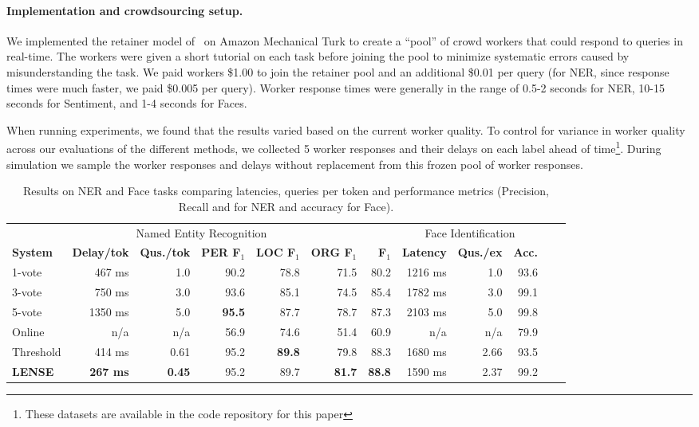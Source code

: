 \paragraph{Implementation and crowdsourcing setup.}
We implemented the retainer model of~\cite{bernstein2011crowds} on Amazon Mechanical Turk to create a ``pool'' of crowd workers that could respond to queries in real-time.
The workers were given a short tutorial on each task before joining the pool to minimize systematic errors caused by misunderstanding the task.
We paid workers \$1.00 to join the retainer pool and an additional \$0.01 per query (for NER, since response times were much faster, we paid \$0.005 per query).
Worker response times were generally in the range of 0.5-2 seconds for NER, 10-15 seconds for Sentiment, and 1-4 seconds for Faces.

When running experiments, we found that the results varied based on the current worker quality. %
To control for variance in worker quality across our evaluations of the different methods, we collected 5 worker responses and their delays on each label ahead of time\footnote{These datasets are available in the code repository for this paper}.
During simulation we sample the worker responses and delays without replacement from this frozen pool of worker responses.

\begin{table}[t]
\begin{tabular}{l r r r r r r | r r r r r}
  \multicolumn{7}{c|}{Named Entity Recognition} & 
      \multicolumn{3}{c}{Face Identification} \\
      \textbf{System} & \textbf{Delay/tok} & \textbf{Qus./tok} & \textbf{PER F$_1$} & \textbf{LOC F$_1$} & \textbf{ORG F$_1$} & \textbf{F$_1$}
          & \textbf{Latency} & \textbf{Qus./ex} & \textbf{Acc.} 
    \\ \hline
    1-vote & 467 ms & 1.0 & 90.2 & 78.8 & 71.5 & 80.2
      & %
      1216 ms & 1.0 & 93.6 \\ %
    3-vote & 750 ms & 3.0 & 93.6 & 85.1 & 74.5 & 85.4
        & %
        1782 ms & 3.0 & 99.1 \\ %
    5-vote & 1350 ms & 5.0 & \textbf{95.5} & 87.7 & 78.7 & 87.3 
        & 
        2103 ms & 5.0 & 99.8 \\ \hline
    Online & n/a & n/a & 56.9 & 74.6 & 51.4 & 60.9
        & n/a & n/a & 79.9 \\    %
    Threshold & 414 ms & 0.61 & 95.2 & \textbf{89.8} & 79.8 & 88.3
        & 1680 ms & 2.66 & 93.5 \\ %
    \textbf{LENSE} & \textbf{267 ms} & \textbf{0.45} & 95.2 & 89.7 & \textbf{81.7} & \textbf{88.8} 
    & 1590 ms & 2.37 & 99.2 \\   %
\end{tabular}
\caption{Results on NER and Face tasks comparing latencies, queries per token and performance metrics (Precision, Recall and \fone{} for NER and accuracy for Face).}
\label{tbl:results}
\end{table}

